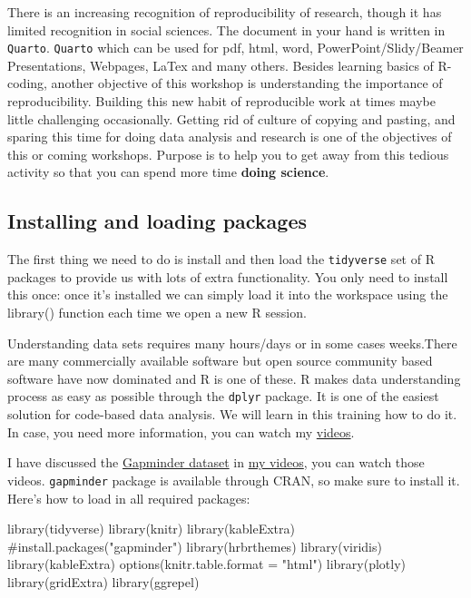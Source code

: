 \documentclass[
  letterpaper,
  DIV=11,
  numbers=noendperiod]{scrartcl}
\newenvironment{Shaded}{\begin{snugshade}}{\end{snugshade}}
\newcommand{\AttributeTok}[1]{\textcolor[rgb]{0.40,0.45,0.13}{#1}}
\newcommand{\CommentTok}[1]{\textcolor[rgb]{0.37,0.37,0.37}{#1}}
\newcommand{\FunctionTok}[1]{\textcolor[rgb]{0.28,0.35,0.67}{#1}}
\newcommand{\NormalTok}[1]{\textcolor[rgb]{0.00,0.23,0.31}{#1}}
\newcommand{\StringTok}[1]{\textcolor[rgb]{0.13,0.47,0.30}{#1}}
\begin{document}
There is an increasing recognition of reproducibility of research,
though it has limited recognition in social sciences. The document in
your hand is written in \texttt{Quarto}. \texttt{Quarto} which can be
used for pdf, html, word, PowerPoint/Slidy/Beamer Presentations,
Webpages, LaTex and many others. Besides learning basics of R-coding,
another objective of this workshop is understanding the importance of
reproducibility. Building this new habit of reproducible work at times
maybe little challenging occasionally. Getting rid of culture of copying
and pasting, and sparing this time for doing data analysis and research
is one of the objectives of this or coming workshops. Purpose is to help
you to get away from this tedious activity so that you can spend more
time \textbf{doing science}.

\hypertarget{installing-and-loading-packages}{%
\subsection{Installing and loading
packages}\label{installing-and-loading-packages}}

The first thing we need to do is install and then load the
\texttt{tidyverse} set of R packages to provide us with lots of extra
functionality. You only need to install this once: once it's installed
we can simply load it into the workspace using the library() function
each time we open a new R session.

Understanding data sets requires many hours/days or in some cases
weeks.There are many commercially available software but open source
community based software have now dominated and R is one of these. R
makes data understanding process as easy as possible through the
\texttt{dplyr} package. It is one of the easiest solution for code-based
data analysis. We will learn in this training how to do it. In case, you
need more information, you can watch my
\href{https://youtu.be/ZNBZevfYgo0}{videos}.

I have discussed the
\href{https://cran.r-project.org/web/packages/gapminder/index.html}{Gapminder
dataset} in \href{youtube}{my videos}, you can watch those videos.
\texttt{gapminder} package is available through CRAN, so make sure to
install it. Here's how to load in all required packages:

\begin{Shaded}
\begin{Highlighting}[]
\FunctionTok{library}\NormalTok{(tidyverse)}
\FunctionTok{library}\NormalTok{(knitr)}
\FunctionTok{library}\NormalTok{(kableExtra)}
\CommentTok{\#install.packages("gapminder")}
\FunctionTok{library}\NormalTok{(hrbrthemes)}
\FunctionTok{library}\NormalTok{(viridis)}
\FunctionTok{library}\NormalTok{(kableExtra)}
\FunctionTok{options}\NormalTok{(}\AttributeTok{knitr.table.format =} \StringTok{"html"}\NormalTok{)}
\FunctionTok{library}\NormalTok{(plotly)}
\FunctionTok{library}\NormalTok{(gridExtra)}
\FunctionTok{library}\NormalTok{(ggrepel)}
\end{Highlighting}
\end{Shaded}
\end{document}
